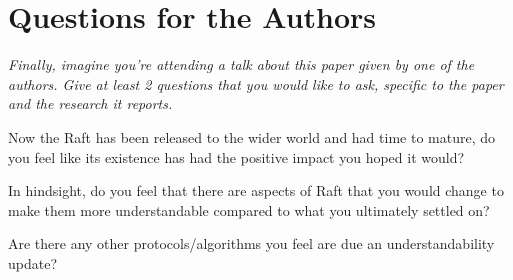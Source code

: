 \documentclass[11pt]{article}
\begin{document}
\section*{Questions for the Authors}

\textsl{Finally, imagine you're attending a talk about this paper given by one
of the authors. Give at least 2 questions that you would like to ask, specific
to the paper and the research it reports.}

Now the Raft has been released to the wider world and had time to mature, do
you feel like its existence has had the positive impact you hoped it would?

In hindsight, do you feel that there are aspects of Raft that you would change
to make them more understandable compared to what you ultimately settled on?

Are there any other protocols/algorithms you feel are due an understandability
update?




\end{document}
